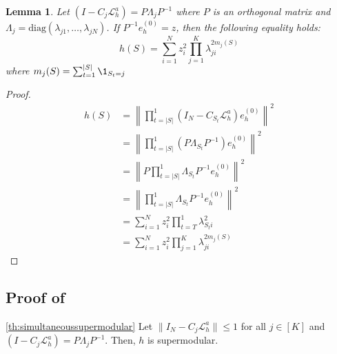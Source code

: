 \documentclass{article} %
\newtheorem{lemma}[theorem]{Lemma}
\begin{document}
\begin{lemma} \label{th:simultaneousallocation}
     Let $\left(I - C_j \mathcal{L}_{h}^a\right) = P\Lambda_jP^{-1}$ where $P$ is an orthogonal matrix and $\Lambda_j = \mathrm{diag}(\lambda_{j1}, \dots, \lambda_{jN})$. If $P^{-1}e^{(0)}_h = z$, then the following equality holds:
     \begin{equation} \label{eq:simultaneous}
          h(S) = \sum_{i = 1}^N z_i^2 \prod_{j = 1}^K \lambda_{ji}^{2m_j(S)}
     \end{equation}
     where $m_j(S) = \sum_{t= 1}^{|S|}\1_{S_t = j}$
\end{lemma}

\begin{proof}

\begin{align*}
    h(S) &= \left\|\prod_{t = |S|}^1\left(I_N - C_{S_t} \mathcal{L}_{h}^a\right)  e^{(0)}_h \right\|^2 \\
    &=  \left\|\prod_{t = |S|}^1\left(P\Lambda_{S_t}P^{-1}\right)  e^{(0)}_h \right\|^2 \\
    &=  \left\|P\prod_{t = |S|}^1\Lambda_{S_t}P^{-1}  e^{(0)}_h \right\|^2 \\
    &= \left\|\prod_{t = |S|}^1\Lambda_{S_t}P^{-1}  e^{(0)}_h \right\|^2\\
    &=  \sum_{i = 1}^N z_i^2 \prod_{t = T}^1 \lambda_{S_ti}^2 \\
    &=  \sum_{i = 1}^N z_i^2 \prod_{j = 1}^K \lambda_{ji}^{2m_j(S)} 
\end{align*}

\end{proof}

\subsection{Proof of } \label{sec:proofsimultaneoussupermodular}
\begin{customproposition}{\ref{th:simultaneoussupermodular}}
    Let $\|I_N - C_j\mathcal{L}_h^a\| \leq 1$ for all $j \in [K]$ and $\left(I - C_j \mathcal{L}_{h}^a\right) = P\Lambda_jP^{-1}$. Then, $h$ is supermodular. 
\end{customproposition}
\end{document}
